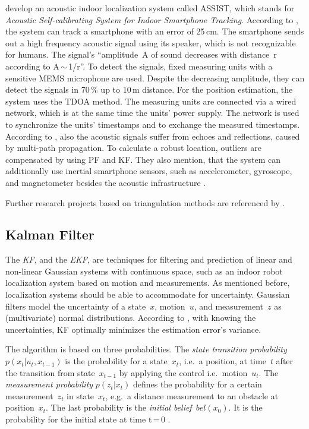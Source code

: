 \citet{hoflinger:acoustic} develop an acoustic indoor localization system called ASSIST, which stands for \emph{Acoustic Self-calibrating System for Indoor Smartphone Tracking}. According to \citet{hoflinger:acoustic}, the system can track a smartphone with an error of 25\,cm. The smartphone sends out a high frequency acoustic signal using its speaker, which is not recognizable for humans. The signal's ``amplitude~A of sound decreases with distance~r according to A\,$\sim$\,1/r''. To detect the signals, fixed measuring units with a sensitive \ac{MEMS} microphone are used. Despite the decreasing amplitude, they can detect the signals in 70\,\% up to 10\,m distance. For the position estimation, the system uses the \ac{TDOA} method. The measuring units are connected via a wired network, which is at the same time the units' power supply. The network is used to synchronize the units' timestamps and to exchange the measured timestamps. According to \citet{hoflinger:acoustic}, also the acoustic signals suffer from echoes and reflections, caused by multi-path propagation. To calculate a robust location, outliers are compensated by using \ac{PF} and \ac{KF}. They also mention, that the system can additionally use inertial smartphone sensors, such as accelerometer, gyroscope, and magnetometer besides the acoustic infrastructure \citep{hoflinger:acoustic, hoflinger:assist}.

Further research projects based on triangulation methods are referenced by \citet{IEEE:survey_wireless_indoor_pos}.


\subsection{Kalman Filter}\label{sec:fund_kf}
The \emph{\acf{KF}}, and the \emph{\acf{EKF}}, are techniques for filtering and prediction of linear and non-linear Gaussian systems with continuous space, such as an indoor robot localization system based on motion and measurements. As mentioned before, localization systems should be able to accommodate for uncertainty. Gaussian filters model the uncertainty of a state~$x$, motion~$u$, and measurement~$z$ as (multivariate) normal distributions. According to \cite{kotanen:exp_local_pos_bt}, with knowing the uncertainties, \ac{KF} optimally minimizes the estimation error's variance.

The algorithm is based on three probabilities. The \emph{state transition probability} $p(x_t | u_t , x_{t-1})$ is the probability for a state~$x_t$, i.e.\ a position, at time~$t$ after the transition from state~$x_{t-1}$ by applying the control i.e.\ motion~$u_t$. The \emph{measurement probability} $p(z_t|x_t)$ defines the probability for a certain measurement~$z_t$ in state~$x_t$, e.g.\ a distance measurement to an obstacle at position~$x_t$. The last probability is the \emph{initial belief}~$bel(x_0)$. It is the probability for the initial state at time t\,=\,0 \citep{thrun:prob_robo}.

